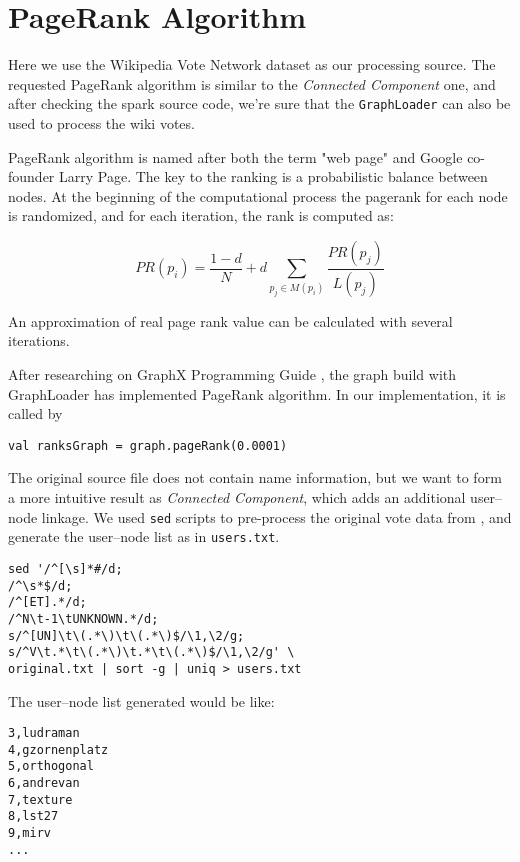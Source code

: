 \section{PageRank Algorithm}

Here we use the Wikipedia Vote Network dataset \cite{wikipedia} as our processing source. The requested PageRank algorithm is similar to the \emph{Connected Component} one, and after checking the spark source code, we're sure that the \texttt{GraphLoader} can also be used to process the wiki votes.

PageRank algorithm is named after both the term "web page" and Google co-founder Larry Page. The key to the ranking is a probabilistic balance between nodes. At the beginning of the computational process the pagerank for each node is randomized, and for each iteration, the rank is computed as:

\begin{equation}
PR(p_i) =\frac{1-d}{N} + d\sum_{p_j\in M(p_i)}\frac{PR(p_j)}{L(p_j)}
\end{equation}

An approximation of real page rank value can be calculated with several iterations.

After researching on GraphX Programming Guide \cite{pagerank}, the graph build with GraphLoader has implemented PageRank algorithm. In our implementation, it is called by

\begin{verbatim}
val ranksGraph = graph.pageRank(0.0001)
\end{verbatim}

The original source file does not contain name information, but we want to form a more intuitive result as \emph{Connected Component}, which adds an additional user--node linkage. We used \texttt{sed} scripts to pre-process the original vote data from \cite{wiki-elec}, and generate the user--node list as in \texttt{users.txt}.

{\small
\begin{verbatim}
sed '/^[\s]*#/d; 
/^\s*$/d;
/^[ET].*/d; 
/^N\t-1\tUNKNOWN.*/d;
s/^[UN]\t\(.*\)\t\(.*\)$/\1,\2/g;
s/^V\t.*\t\(.*\)\t.*\t\(.*\)$/\1,\2/g' \
original.txt | sort -g | uniq > users.txt
\end{verbatim}
}

The user--node list generated would be like:

{\small
\begin{verbatim}
3,ludraman
4,gzornenplatz
5,orthogonal
6,andrevan
7,texture
8,lst27
9,mirv
...
\end{verbatim}
}

